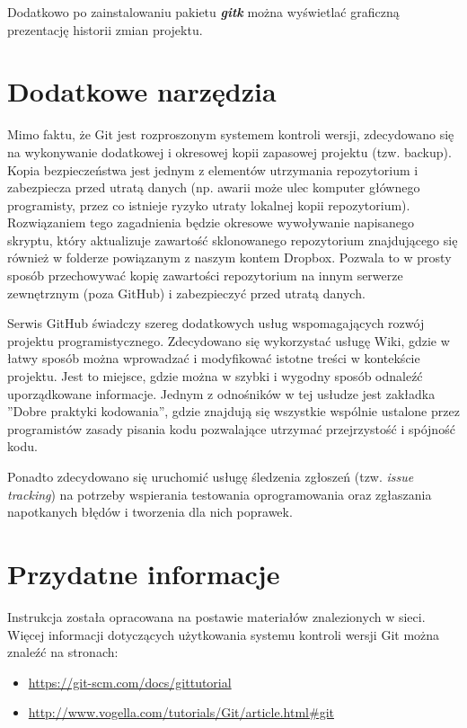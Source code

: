 Dodatkowo po zainstalowaniu pakietu \textit{\textbf{gitk}} można wyświetlać graficzną prezentację historii zmian projektu.

\section{Dodatkowe narzędzia}
	Mimo faktu, że Git jest rozproszonym systemem kontroli wersji, zdecydowano się na wykonywanie dodatkowej i okresowej kopii zapasowej projektu (tzw. backup). Kopia bezpieczeństwa jest jednym z elementów utrzymania repozytorium i zabezpiecza przed utratą danych (np. awarii może ulec komputer głównego programisty, przez co istnieje ryzyko utraty lokalnej kopii repozytorium). Rozwiązaniem tego zagadnienia będzie okresowe wywoływanie napisanego skryptu, który aktualizuje zawartość sklonowanego repozytorium znajdującego się również w folderze powiązanym z naszym kontem Dropbox. Pozwala to w prosty sposób przechowywać kopię zawartości repozytorium na innym serwerze zewnętrznym (poza GitHub) i zabezpieczyć przed utratą danych.

Serwis GitHub świadczy szereg dodatkowych usług wspomagających rozwój projektu programistycznego. Zdecydowano się wykorzystać usługę Wiki, gdzie w łatwy sposób można wprowadzać i modyfikować istotne treści w kontekście projektu. Jest to miejsce, gdzie można w szybki i wygodny sposób odnaleźć uporządkowane informacje. Jednym z odnośników w tej usłudze jest zakładka ''Dobre praktyki kodowania'', gdzie znajdują się wszystkie wspólnie ustalone przez programistów zasady pisania kodu pozwalające utrzymać przejrzystość i spójność kodu.

	Ponadto zdecydowano się uruchomić usługę śledzenia zgłoszeń (tzw. \textit{issue tracking}) na potrzeby wspierania testowania oprogramowania oraz zgłaszania napotkanych błędów i tworzenia dla nich poprawek.

\section{Przydatne informacje}
Instrukcja została opracowana na postawie materiałów znalezionych w sieci. Więcej informacji dotyczących użytkowania systemu kontroli wersji Git można znaleźć na stronach:
\begin{itemize}
\item \url{https://git-scm.com/docs/gittutorial}
\item \url{http://www.vogella.com/tutorials/Git/article.html\#git}
\end{itemize}